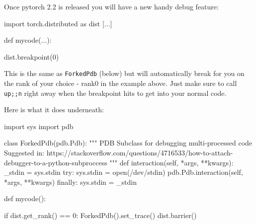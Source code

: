 \documentclass[
]{report}
\newenvironment{Shaded}{\begin{snugshade}}{\end{snugshade}}
\newcommand{\BuiltInTok}[1]{\textcolor[rgb]{0.00,0.23,0.31}{#1}}
\newcommand{\CommentTok}[1]{\textcolor[rgb]{0.37,0.37,0.37}{#1}}
\newcommand{\ControlFlowTok}[1]{\textcolor[rgb]{0.00,0.23,0.31}{#1}}
\newcommand{\DecValTok}[1]{\textcolor[rgb]{0.68,0.00,0.00}{#1}}
\newcommand{\ImportTok}[1]{\textcolor[rgb]{0.00,0.46,0.62}{#1}}
\newcommand{\KeywordTok}[1]{\textcolor[rgb]{0.00,0.23,0.31}{#1}}
\newcommand{\NormalTok}[1]{\textcolor[rgb]{0.00,0.23,0.31}{#1}}
\newcommand{\OperatorTok}[1]{\textcolor[rgb]{0.37,0.37,0.37}{#1}}
\newcommand{\StringTok}[1]{\textcolor[rgb]{0.13,0.47,0.30}{#1}}
\newcommand{\VariableTok}[1]{\textcolor[rgb]{0.07,0.07,0.07}{#1}}
\begin{document}
Once pytorch 2.2 is released you will have a new handy debug feature:

\begin{Shaded}
\begin{Highlighting}[]
\ImportTok{import}\NormalTok{ torch.distributed }\ImportTok{as}\NormalTok{ dist}
\NormalTok{[...]}

\KeywordTok{def}\NormalTok{ mycode(...):}

\NormalTok{   dist.}\BuiltInTok{breakpoint}\NormalTok{(}\DecValTok{0}\NormalTok{)}
\end{Highlighting}
\end{Shaded}

This is the same as \texttt{ForkedPdb} (below) but will automatically
break for you on the rank of your choice - rank0 in the example above.
Just make sure to call \texttt{up;;n} right away when the breakpoint
hits to get into your normal code.

Here is what it does underneath:

\begin{Shaded}
\begin{Highlighting}[]
\ImportTok{import}\NormalTok{ sys}
\ImportTok{import}\NormalTok{ pdb}

\KeywordTok{class}\NormalTok{ ForkedPdb(pdb.Pdb):}
    \CommentTok{"""}
\CommentTok{    PDB Subclass for debugging multi{-}processed code}
\CommentTok{    Suggested in: https://stackoverflow.com/questions/4716533/how{-}to{-}attach{-}debugger{-}to{-}a{-}python{-}subproccess}
\CommentTok{    """}
    \KeywordTok{def}\NormalTok{ interaction(}\VariableTok{self}\NormalTok{, }\OperatorTok{*}\NormalTok{args, }\OperatorTok{**}\NormalTok{kwargs):}
\NormalTok{        \_stdin }\OperatorTok{=}\NormalTok{ sys.stdin}
        \ControlFlowTok{try}\NormalTok{:}
\NormalTok{            sys.stdin }\OperatorTok{=} \BuiltInTok{open}\NormalTok{(}\StringTok{\textquotesingle{}/dev/stdin\textquotesingle{}}\NormalTok{)}
\NormalTok{            pdb.Pdb.interaction(}\VariableTok{self}\NormalTok{, }\OperatorTok{*}\NormalTok{args, }\OperatorTok{**}\NormalTok{kwargs)}
        \ControlFlowTok{finally}\NormalTok{:}
\NormalTok{            sys.stdin }\OperatorTok{=}\NormalTok{ \_stdin}


\KeywordTok{def}\NormalTok{ mycode():}

    \ControlFlowTok{if}\NormalTok{ dist.get\_rank() }\OperatorTok{==} \DecValTok{0}\NormalTok{:}
\NormalTok{        ForkedPdb().set\_trace()}
\NormalTok{    dist.barrier()}
\end{Highlighting}
\end{Shaded}
\end{document}
